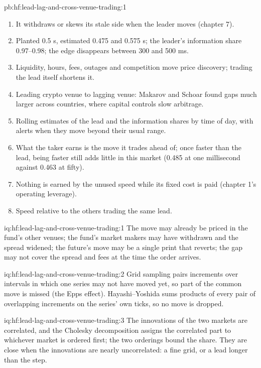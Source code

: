 \begin{solution}{pb:hf:lead-lag-and-cross-venue-trading:1}
\begin{enumerate}
\item It withdraws or skews its stale side when the leader moves (chapter 7).
\item Planted 0.5 s, estimated 0.475 and 0.575 s; the leader's information share 0.97--0.98; the edge disappears between 300 and 500 ms.
\item Liquidity, hours, fees, outages and competition move price discovery; trading the lead itself shortens it.
\item Leading crypto venue to lagging venue: Makarov and Schoar found gaps much larger across countries, where capital controls slow arbitrage.
\item Rolling estimates of the lead and the information shares by time of day, with alerts when they move beyond their usual range.
\item What the taker earns is the move it trades ahead of; once faster than the lead, being faster still adds little in this market (0.485 at one
millisecond against 0.463 at fifty).
\item Nothing is earned by the unused speed while its fixed cost is paid (chapter 1's operating leverage).
\item Speed relative to the others trading the same lead.
\end{enumerate}
\end{solution}

\begin{solution}{iq:hf:lead-lag-and-cross-venue-trading:1}
The move may already be priced in the fund's other venues; the fund's market makers may have withdrawn and the spread widened; the future's move
may be a single print that reverts; the gap may not cover the spread and fees at the time the order arrives.
\end{solution}

\begin{solution}{iq:hf:lead-lag-and-cross-venue-trading:2}
Grid sampling pairs increments over intervals in which one series may not have moved yet, so part of the common move is missed (the Epps effect).
Hayashi--Yoshida sums products of every pair of overlapping increments on the series' own ticks, so no move is dropped.
\end{solution}

\begin{solution}{iq:hf:lead-lag-and-cross-venue-trading:3}
The innovations of the two markets are correlated, and the Cholesky decomposition assigns the correlated part to whichever market is ordered first;
the two orderings bound the share. They are close when the innovations are nearly uncorrelated: a fine grid, or a lead longer than the step.
\end{solution}

